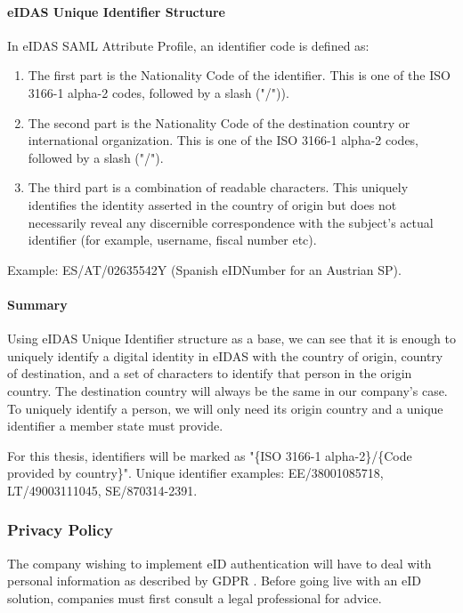 \paragraph{eIDAS Unique Identifier Structure} In eIDAS SAML Attribute Profile, an identifier code is defined as:
\begin{enumerate}
  \item The first part is the Nationality Code of the identifier. This is one of the ISO 3166-1 alpha-2 codes, followed by a slash ("/")).
  \item The second part is the Nationality Code of the destination country or international organization. This is one of the ISO 3166-1 alpha-2 codes, followed by a slash ("/").
  \item The third part is a combination of readable characters. This uniquely identifies the identity asserted in the country of origin but does not necessarily reveal any discernible correspondence with the subject's actual identifier (for example, username, fiscal number etc).
\end{enumerate}

Example: ES/AT/02635542Y (Spanish eIDNumber for an Austrian SP).

\paragraph{Summary} Using eIDAS Unique Identifier structure as a base, we can see that it is enough to uniquely identify a digital identity in eIDAS with the country of origin, country of destination, and a set of characters to identify that person in the origin country. The destination country will always be the same in our company's case. To uniquely identify a person, we will only need its origin country and a unique identifier a member state must provide.

For this thesis, identifiers will be marked as "{\{ISO 3166-1 alpha-2\}}/{\{Code provided by country\}}". Unique identifier examples: EE/38001085718, LT/49003111045, SE/870314-2391.

\subsubsection{Privacy Policy}

The company wishing to implement eID authentication will have to deal with personal information as described by GDPR \cite{eulaw-gdpr}. Before going live with an eID solution, companies must first consult a legal professional for advice.

